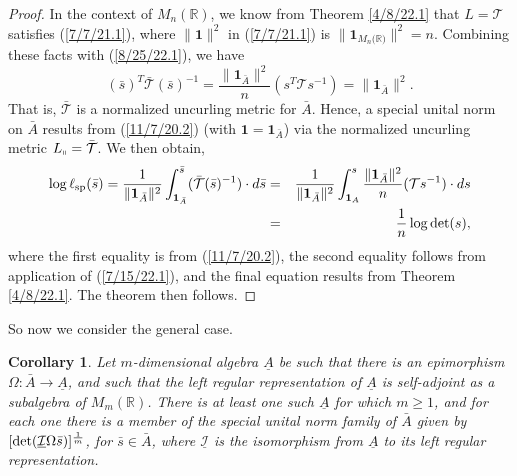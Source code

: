 \documentclass{amsart}
\numberwithin{equation}{section}
\newtheorem{corollary}[theorem]{Corollary}
\theoremstyle{definition}
\numberwithin{theorem}{section}
\begin{document}
\begin{proof}
In the context of $M_n(\mathbb{R})$, we know from Theorem \ref{4/8/22.1} that $L=\mathcal{T}$ satisfies (\ref{7/7/21.1}), where $\|\mathbf{1}\|^2$ in  (\ref{7/7/21.1}) is $\|\mathbf{1}_{M_n({\mathbb{R})}}\|^2 = n$.  Combining these facts with (\ref{8/25/22.1}), we have \begin{equation}\label{9/27/23.1} (\bar{s})^T \bar{\mathcal{T}} (\bar{s})^{-1} = \frac{\|\mathbf{1}_{\bar{A}}\|^2}{n}( s^T \mathcal{T} s^{-1}) = \|\mathbf{1}_{\bar{A}}\|^2 .\end{equation} 
That is, $\mathcal{\bar{T}}$ is a normalized uncurling metric for $\bar{A}$.  Hence, a special unital norm on $\bar{A}$ results from (\ref{11/7/20.2}) (with $\mathbf{1}=\mathbf{1}_{\bar{A}}$)  via the normalized uncurling metric $L_{\shortparallel} = \bar{\mathcal{T}}$.  
  We then obtain, 
\begin{eqnarray}\nonumber \log\ell_{\rm sp}(\bar{s}) = \frac{1}{\|\mathbf{1}_{\bar{A}}\|^2} \int_{\mathbf{1}_{\bar{A}}}^{\bar{s}} (\bar{\mathcal{T}}(\bar{s})^{-1})\cdot d\bar{s}
 &=& \frac{1}{\|\mathbf{1}_{\bar{A}}\|^2} \int_{\mathbf{1}_{A}}^{s} \frac{\|\mathbf{1}_{\bar{A}}\|^2}{n}(\mathcal{T}s^{-1})\cdot ds \\ &=& \frac{1}{n} \log\text{det}(s),\label{9/27/23.2}\end{eqnarray} where the first equality is from (\ref{11/7/20.2}), the second equality follows from application of (\ref{7/15/22.1}), and the final equation results from Theorem \ref{4/8/22.1}.
The theorem then follows. 
 \end{proof} 
  
So now we consider the general case.
 
  \begin{corollary}\label{11/17/22.1}
  Let $m$-dimensional algebra $\underline{A}$ be such that there is an epimorphism $\Omega:\bar{A}\rightarrow \underline{A}$, and such that the left regular representation of $\underline{A}$ is self-adjoint as a subalgebra of $M_m(\mathbb{R})$. There is at least one such $\underline{A}$ for which $m\ge 1$, and for each one there is a member of the special unital norm family of  $\bar{A}$ given by $[{\rm det}(\underline{\mathcal{I}}\Omega \bar{s})]^{\frac{1}{m}}$, for $\bar{s}\in\bar{A}$, where $\underline{\mathcal{I}}$ is the isomorphism from $\underline{A}$ to its left regular representation.
  \end{corollary}
 
\end{document}
